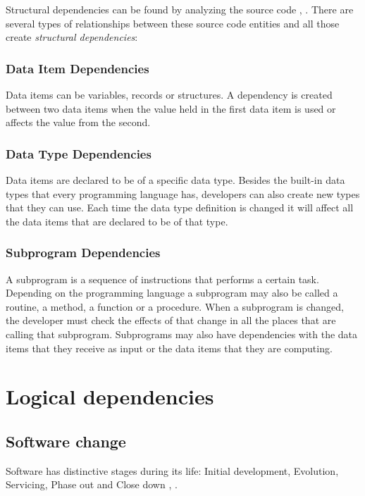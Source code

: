 \documentclass[12pt, a4paper, twoside]{report}
\begin{document}
Structural dependencies can be found by analyzing the source code \cite{Sangal:2005:UDM:1094811.1094824}, \cite{CalloArias2011}. 
There are several types of relationships between these source code entities and all those create \textit{structural dependencies}:

\subsubsection{Data Item Dependencies}
Data items can be variables, records or structures. A dependency is created between two data items when the value held in the first data item is used or affects the value from the second.

\subsubsection{Data Type Dependencies}
Data items are declared to be of a specific data type. Besides the built-in data types that every programming language has, developers can also create new types that they can use. Each time the data type definition is changed it will affect all the data items that are declared to be of that type. 

\subsubsection{Subprogram Dependencies}
A subprogram is a sequence of instructions that performs a certain task. Depending on the programming language a subprogram may also be called a routine, a method, a function or a procedure. When a subprogram is changed, the developer must check the effects of that change in all the places that are calling that subprogram. Subprograms may also have dependencies with the data items that they receive as input or the data items that they are computing.



\section{Logical dependencies}

\subsection{Software change}
\label{change}

Software has distinctive stages during its life: Initial development, Evolution, Servicing, Phase out and Close down \cite{Software-life-cycle}, \cite{model-bennett}.
\end{document}
